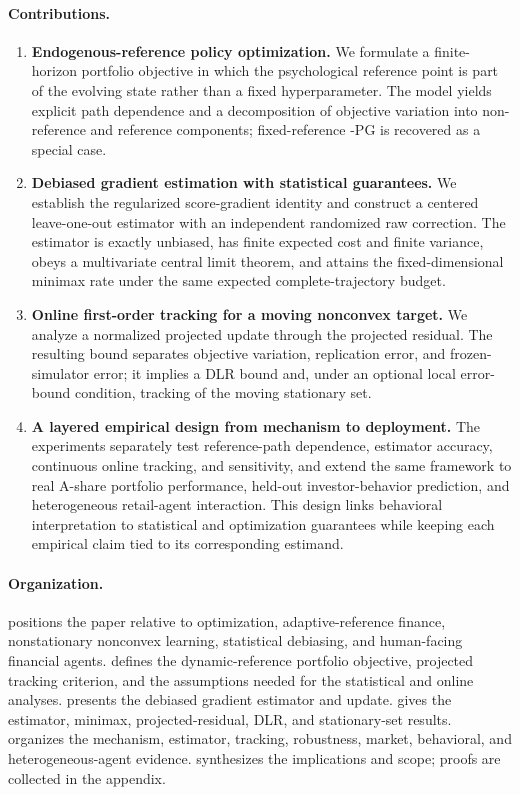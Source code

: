 \paragraph{Contributions.}
\begin{enumerate}[leftmargin=2em]
\item \textbf{Endogenous-reference \CPT policy optimization.}  We formulate a finite-horizon portfolio objective in which the psychological reference point is part of the evolving state rather than a fixed hyperparameter.  The model yields explicit path dependence and a decomposition of objective variation into non-reference and reference components; fixed-reference \CPT-PG is recovered as a special case.
\item \textbf{Debiased gradient estimation with statistical guarantees.}  We establish the regularized \CPT score-gradient identity and construct a centered leave-one-out estimator with an independent randomized raw correction.  The estimator is exactly unbiased, has finite expected cost and finite variance, obeys a multivariate central limit theorem, and attains the fixed-dimensional minimax rate under the same expected complete-trajectory budget.
\item \textbf{Online first-order tracking for a moving nonconvex target.}  We analyze a normalized projected update through the projected residual.  The resulting bound separates objective variation, replication error, and frozen-simulator error; it implies a DLR bound and, under an optional local error-bound condition, tracking of the moving stationary set.
\item \textbf{A layered empirical design from mechanism to deployment.}  The experiments separately test reference-path dependence, estimator accuracy, continuous online tracking, and sensitivity, and extend the same framework to real A-share portfolio performance, held-out investor-behavior prediction, and heterogeneous retail-agent interaction.  This design links behavioral interpretation to statistical and optimization guarantees while keeping each empirical claim tied to its corresponding estimand.
\end{enumerate}

\paragraph{Organization.}
 positions the paper relative to \CPT optimization, adaptive-reference finance, nonstationary nonconvex learning, statistical debiasing, and human-facing financial agents.   defines the dynamic-reference portfolio objective, projected tracking criterion, and the assumptions needed for the statistical and online analyses.   presents the debiased gradient estimator and \DRCPTPG update.   gives the estimator, minimax, projected-residual, DLR, and stationary-set results.   organizes the mechanism, estimator, tracking, robustness, market, behavioral, and heterogeneous-agent evidence.   synthesizes the implications and scope; proofs are collected in the appendix.
